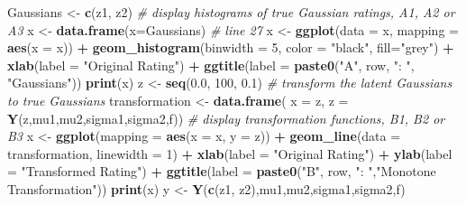 \documentclass[
]{book}
\newenvironment{Shaded}{\begin{snugshade}}{\end{snugshade}}
\newcommand{\CommentTok}[1]{\textcolor[rgb]{0.56,0.35,0.01}{\textit{#1}}}
\newcommand{\DataTypeTok}[1]{\textcolor[rgb]{0.13,0.29,0.53}{#1}}
\newcommand{\DecValTok}[1]{\textcolor[rgb]{0.00,0.00,0.81}{#1}}
\newcommand{\FloatTok}[1]{\textcolor[rgb]{0.00,0.00,0.81}{#1}}
\newcommand{\KeywordTok}[1]{\textcolor[rgb]{0.13,0.29,0.53}{\textbf{#1}}}
\newcommand{\NormalTok}[1]{#1}
\newcommand{\OperatorTok}[1]{\textcolor[rgb]{0.81,0.36,0.00}{\textbf{#1}}}
\newcommand{\StringTok}[1]{\textcolor[rgb]{0.31,0.60,0.02}{#1}}
\begin{document}
\begin{Shaded}
\begin{Highlighting}[]
\NormalTok{  Gaussians <-}\StringTok{ }\KeywordTok{c}\NormalTok{(z1, z2)}
  \CommentTok{# display histograms of true Gaussian ratings, A1, A2 or A3}
\NormalTok{  x <-}\StringTok{ }\KeywordTok{data.frame}\NormalTok{(}\DataTypeTok{x=}\NormalTok{Gaussians) }\CommentTok{#  line 27}
\NormalTok{  x <-}\StringTok{  }
\StringTok{    }\KeywordTok{ggplot}\NormalTok{(}\DataTypeTok{data =}\NormalTok{ x, }\DataTypeTok{mapping =} \KeywordTok{aes}\NormalTok{(}\DataTypeTok{x =}\NormalTok{ x)) }\OperatorTok{+}
\StringTok{    }\KeywordTok{geom_histogram}\NormalTok{(}\DataTypeTok{binwidth =} \DecValTok{5}\NormalTok{, }\DataTypeTok{color =} \StringTok{"black"}\NormalTok{, }\DataTypeTok{fill=}\StringTok{"grey"}\NormalTok{) }\OperatorTok{+}\StringTok{ }
\StringTok{    }\KeywordTok{xlab}\NormalTok{(}\DataTypeTok{label =} \StringTok{"Original Rating"}\NormalTok{) }\OperatorTok{+}\StringTok{ }
\StringTok{    }\KeywordTok{ggtitle}\NormalTok{(}\DataTypeTok{label =} \KeywordTok{paste0}\NormalTok{(}\StringTok{"A"}\NormalTok{, row, }\StringTok{": "}\NormalTok{, }\StringTok{"Gaussians"}\NormalTok{))}
  \KeywordTok{print}\NormalTok{(x)}
\NormalTok{  z <-}\StringTok{ }\KeywordTok{seq}\NormalTok{(}\FloatTok{0.0}\NormalTok{, }\DecValTok{100}\NormalTok{, }\FloatTok{0.1}\NormalTok{)}
  \CommentTok{# transform the latent Gaussians to true Gaussians}
\NormalTok{  transformation <-}\StringTok{ }
\StringTok{    }\KeywordTok{data.frame}\NormalTok{(}
      \DataTypeTok{x =}\NormalTok{ z, }
      \DataTypeTok{z =}  \KeywordTok{Y}\NormalTok{(z,mu1,mu2,sigma1,sigma2,f))}
  \CommentTok{# display transformation functions, B1, B2 or B3}
\NormalTok{  x <-}\StringTok{ }
\StringTok{    }\KeywordTok{ggplot}\NormalTok{(}\DataTypeTok{mapping =} \KeywordTok{aes}\NormalTok{(}\DataTypeTok{x =}\NormalTok{ x, }\DataTypeTok{y =}\NormalTok{ z)) }\OperatorTok{+}\StringTok{ }
\StringTok{    }\KeywordTok{geom_line}\NormalTok{(}\DataTypeTok{data =}\NormalTok{ transformation, }\DataTypeTok{linewidth =} \DecValTok{1}\NormalTok{) }\OperatorTok{+}
\StringTok{    }\KeywordTok{xlab}\NormalTok{(}\DataTypeTok{label =} \StringTok{"Original Rating"}\NormalTok{) }\OperatorTok{+}
\StringTok{    }\KeywordTok{ylab}\NormalTok{(}\DataTypeTok{label =} \StringTok{"Transformed Rating"}\NormalTok{) }\OperatorTok{+}\StringTok{ }
\StringTok{    }\KeywordTok{ggtitle}\NormalTok{(}\DataTypeTok{label =} \KeywordTok{paste0}\NormalTok{(}\StringTok{"B"}\NormalTok{, row, }\StringTok{": "}\NormalTok{,}\StringTok{"Monotone Transformation"}\NormalTok{))}
  \KeywordTok{print}\NormalTok{(x)}
\NormalTok{  y <-}\StringTok{ }\KeywordTok{Y}\NormalTok{(}\KeywordTok{c}\NormalTok{(z1, z2),mu1,mu2,sigma1,sigma2,f)}

\end{Highlighting}
\end{Shaded}
\end{document}
